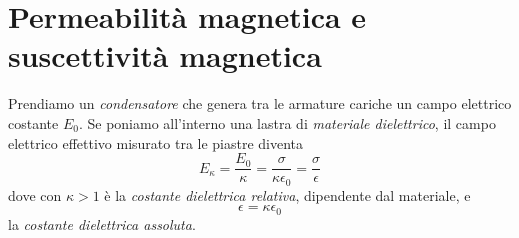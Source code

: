 \section{Permeabilità magnetica e suscettività magnetica}
\begin{comment}%
Come si comporta il campo magnetico all'interno dei materiali?\\
Valgono tutti i caveat già visti nell'elettricità nei materiali dielettrici.\\
Per avere un modello realistico serve un modello quantistico, gli altri infatti non hanno un valore quantitativo.\\
Nel caso dielettrico partendo da osservazioni macroscopiche, deduciamo meccanismi sulle proprietà materiali e poi non ci addentreremo nei meccanismi microscopici, per cui serve quantistica. Per quanto riguarda gli aspetti magnetici delle particelle microscopiche dipendono (?)
Un campo magnetico si accoppia ad una particella solo se questa è carica ed è in moto, che prende momento magnetico se, nel caso della spira, si muove di moto circolare.\\
Un'interpretazione che possiamo dare è ch l'elettrone nella sua rotazione intorno al  nucleo, produce un momento angolare che si allinea con il campo magnetico, ma questo è errato dal punto di vista quantitativo,infatti l'elettrone non gira intorno all'atomo ma si dispone sui livelli energetici degli orbitali.\\
Inoltre gli elettroni hanno anche momento angolare intrinseco (analogo alla rotazione su sè stesso), ed è lo \textit{spin} \index{spin}. Esso è una caratteristica intrinseca, che produce un momento di dipolo magnetico che si accoppia con il campo magnetico e si allinea.\\
La descrizione classica dei momenti di dipolo magnetico che si allineano o disallineano dà un'intuizione, ma per una comprensione efficace fenomeni servono modelli statistici e quantistici che non abbiamo e non tratteremo in questo corso.
\end{comment}
\begin{remember}
Prendiamo un \textit{condensatore} che genera tra le armature cariche un campo elettrico costante $E_0$. Se poniamo all'interno una lastra di \textit{materiale dielettrico}, il campo elettrico effettivo misurato tra le piastre diventa
\begin{equation*}
	E_\kappa=\frac{E_0}{\kappa}=\frac{\sigma}{\kappa\epsilon_0}=\frac{\sigma}{\epsilon}
\end{equation*}
dove con $\kappa>1$ è la \textit{costante dielettrica relativa}, dipendente dal materiale, e
\begin{equation*}
	\epsilon=\kappa \epsilon_0
\end{equation*}
la \textit{costante dielettrica assoluta}.
\end{remember}
